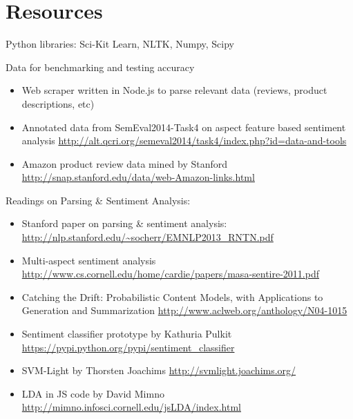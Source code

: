 \documentclass{article}
\begin{document}
\section{Resources}

Python libraries: Sci-Kit Learn, NLTK, Numpy, Scipy

Data for benchmarking and testing accuracy

\begin{itemize}
\item Web scraper written in Node.js to parse relevant data (reviews, product descriptions, etc)
\newline 

\item Annotated data from SemEval2014-Task4 on aspect feature based sentiment analysis
\newline
\url{http://alt.qcri.org/semeval2014/task4/index.php?id=data-and-tools}

\item Amazon product review data mined by Stanford
\newline
\url{http://snap.stanford.edu/data/web-Amazon-links.html}
\end{itemize}

Readings on Parsing \& Sentiment Analysis:
\begin{itemize}
\item Stanford paper on parsing \& sentiment analysis:
\newline
\url{http://nlp.stanford.edu/~socherr/EMNLP2013_RNTN.pdf}

\item Multi-aspect sentiment analysis
\newline 
\url{http://www.cs.cornell.edu/home/cardie/papers/masa-sentire-2011.pdf}

\item Catching the Drift: Probabilistic Content Models, with Applications to
Generation and Summarization \newline
\url{http://www.aclweb.org/anthology/N04-1015}


\item Sentiment classifier prototype by Kathuria Pulkit 
\newline
\url{https://pypi.python.org/pypi/sentiment_classifier}

\item SVM-Light by Thorsten Joachims
\newline
\url{http://svmlight.joachims.org/}

\item LDA in JS code by David Mimno
\newline
\url{http://mimno.infosci.cornell.edu/jsLDA/index.html}

\end{itemize}
\end{document}
